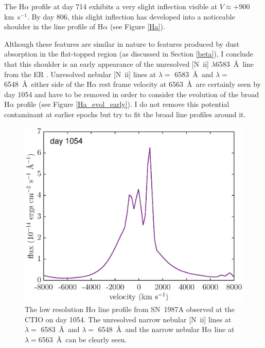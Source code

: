 The H$\alpha$ profile at day 714 exhibits a very slight inflection visible 
at $V \approx +900$ km~s$^{-1}$.  By day 806, this slight inflection has 
developed into a noticeable shoulder in the line profile of H$\alpha$ (see 
Figure \ref{Ha}).




Although these features are similar in nature to features produced by dust 
absorption in the flat-topped region (as discussed in Section \ref{beta}), 
I conclude that this shoulder is an early appearance of the unresolved 
[N~{\sc ii}] $\lambda$6583~\AA\ line from the ER \citep{Kozma1998b}.  Unresolved nebular [N~{\sc ii}] lines at $\lambda=$ 6583~\AA\ and 
$\lambda=$ 6548~\AA\ either side of the H$\alpha$ rest frame velocity at 
6563~\AA\ are certainly seen by day 1054 
and have to be removed in order to consider the evolution of the broad 
H$\alpha$ profile (see Figure \ref{Ha_evol_early}). I do not remove this 
potential contaminant at earlier epochs but try to fit the broad line 
profiles around it.

 

\begin{figure}
\centering
\includegraphics[clip=true,scale=0.6,trim= 0 0 0 0]{chapters/chapter5/images/d1054Ha}
\caption{The low resolution H$\alpha$ line profile from SN~1987A observed at the CTIO on day 1054.  The unresolved narrow nebular [N~{\sc ii}] lines at $\lambda=$ 6583~\AA\ and $\lambda=$ 6548~\AA\ and the narrow nebular H$\alpha$ line at $\lambda=$6563~\AA\  can be clearly seen.}
\label{d1054_Ha}
\end{figure}
 
